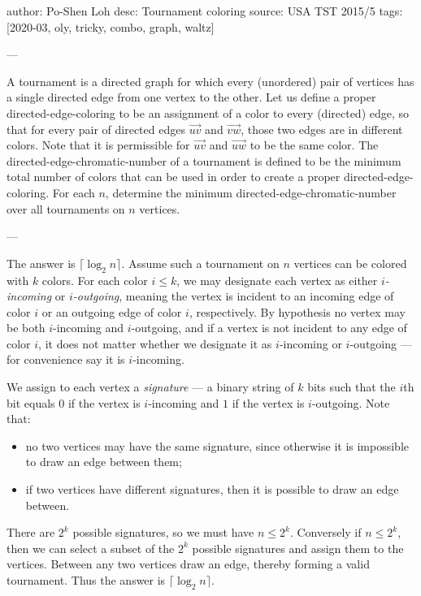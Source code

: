 author: Po-Shen Loh
desc: Tournament coloring
source: USA TST 2015/5
tags: [2020-03, oly, tricky, combo, graph, waltz]

---

A tournament is a directed graph for which every (unordered) pair of vertices has a single directed edge from one vertex to the other. Let us define a proper directed-edge-coloring to be an assignment of a color to every (directed) edge, so that for every pair of directed edges $\overrightarrow{uv}$ and $\overrightarrow{vw}$, those two edges are in different colors. Note that it is permissible for $\overrightarrow{uv}$ and $\overrightarrow{uw}$ to be the same color. The directed-edge-chromatic-number of a tournament is defined to be the minimum total number of colors that can be used in order to create a proper directed-edge-coloring. For each $n$, determine the minimum directed-edge-chromatic-number over all tournaments on $n$ vertices.

---

The answer is $\lceil\log_2 n\rceil$. Assume such a tournament on $n$ vertices can be colored with $k$ colors. For each color $i\le k$, we may designate each vertex as either \emph{$i$-incoming} or \emph{$i$-outgoing}, meaning the vertex is incident to an incoming edge of color $i$ or an outgoing edge of color $i$, respectively. By hypothesis no vertex may be both $i$-incoming and $i$-outgoing, and if a vertex is not incident to any edge of color $i$, it does not matter whether we designate it as $i$-incoming or $i$-outgoing --- for convenience say it is $i$-incoming.

We assign to each vertex a \emph{signature} --- a binary string of $k$ bits such that the $i$th bit equals $0$ if the vertex is $i$-incoming and $1$ if the vertex is $i$-outgoing. Note that:
\begin{itemize}
    \item no two vertices may have the same signature, since otherwise it is impossible to draw an edge between them;
    \item if two vertices have different signatures, then it is possible to draw an edge between.
\end{itemize}
There are $2^k$ possible signatures, so we must have $n\le2^k$. Conversely if $n\le2^k$, then we can select a subset of the $2^k$ possible signatures and assign them to the vertices. Between any two vertices draw an edge, thereby forming a valid tournament. Thus the answer is $\lceil\log_2 n\rceil$.
